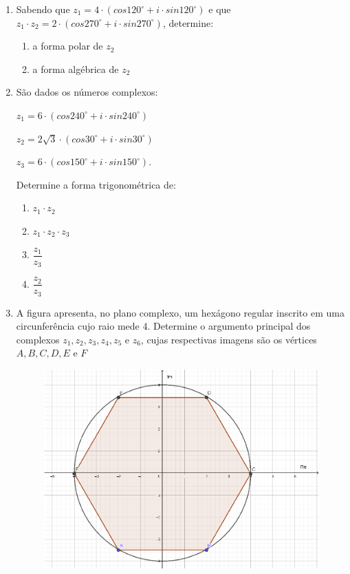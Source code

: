 \documentclass[a4paper, 11pt]{article}
\begin{document}
\begin{enumerate}
\item Sabendo que $z_1 = 4\cdot(cos120^{\circ} + i\cdot sin120^{\circ})$ e que $z_1\cdot z_2 = 2\cdot(cos270^{\circ} + i\cdot sin270^{\circ})$, determine:
	\begin{enumerate}
	\item a forma polar de $z_2$
	\item a forma algébrica de $z_2$
	\end{enumerate}

\item São dados os números complexos:

$z_1 = 6\cdot(cos240^{\circ} + i\cdot sin240^{\circ})$

$z_2 = 2\sqrt{3}\cdot(cos30^{\circ} + i\cdot sin30^{\circ})$

$z_3 = 6\cdot(cos150^{\circ} + i\cdot sin150^{\circ})$.

Determine a forma trigonométrica de:
	\begin{enumerate}
	\item $z_1 \cdot z_2$
	\item $z_1 \cdot z_2 \cdot z_3$
	\item $\dfrac{z_1}{z_3}$
	\item $\dfrac{z_2}{z_3}$
	\end{enumerate}
	
\item A figura apresenta, no plano complexo, um hexágono regular inscrito em uma circunferência cujo raio mede 4. Determine o argumento principal dos complexos $z_1, z_2, z_3, z_4, z_5 \textrm{ e } z_6$, cujas respectivas imagens são os vértices $A, B, C, D, E \textrm{ e } F$
	\begin{figure}[h]
	\centering
	\includegraphics[scale=0.5]{geogebra-export_1.eps}
	\end{figure}


\end{enumerate}
\end{document}
